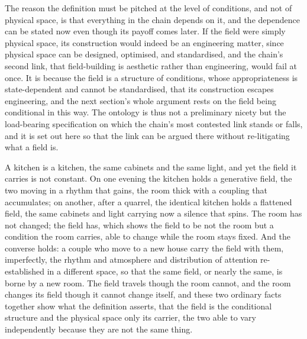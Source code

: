 
The reason the definition must be pitched at the level of conditions, and not of physical space, is that everything in the chain depends on it, and the dependence can be stated now even though its payoff comes later. If the field were simply physical space, its construction would indeed be an engineering matter, since physical space can be designed, optimised, and standardised, and the chain's second link, that field-building is aesthetic rather than engineering, would fail at once. It is because the field is a structure of conditions, whose appropriateness is state-dependent and cannot be standardised, that its construction escapes engineering, and the next section's whole argument rests on the field being conditional in this way. The ontology is thus not a preliminary nicety but the load-bearing specification on which the chain's most contested link stands or falls, and it is set out here so that the link can be argued there without re-litigating what a field is.

\begin{casebox}
A kitchen is a kitchen, the same cabinets and the same light, and yet the field it carries is not constant. On one evening the kitchen holds a generative field, the two moving in a rhythm that gains, the room thick with a coupling that accumulates; on another, after a quarrel, the identical kitchen holds a flattened field, the same cabinets and light carrying now a silence that spins. The room has not changed; the field has, which shows the field to be not the room but a condition the room carries, able to change while the room stays fixed. And the converse holds: a couple who move to a new house carry the field with them, imperfectly, the rhythm and atmosphere and distribution of attention re-established in a different space, so that the same field, or nearly the same, is borne by a new room. The field travels though the room cannot, and the room changes its field though it cannot change itself, and these two ordinary facts together show what the definition asserts, that the field is the conditional structure and the physical space only its carrier, the two able to vary independently because they are not the same thing.
\end{casebox}

